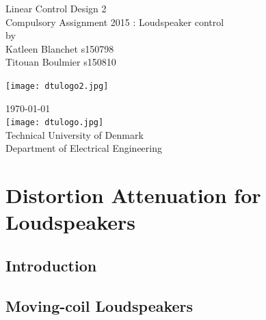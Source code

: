 \documentclass[12pt,a4paper,fleqn, onesside]{report}
\begin{document}
\begin{titlepage}
\begin{center}
\vspace{4cm}
\Huge{ Linear Control Design 2}\\
\vspace{0.8cm}
\large{\sc Compulsory Assignment 2015 : Loudspeaker control\\}
\vspace{1.2cm}
\normalsize{by}\\
\vspace{1.2cm}
{\sc
\large Katleen Blanchet s150798  \\ 
Titouan Boulmier s150810\\
}
\vspace{2cm}
\begin{center}
\texttt{[image: dtulogo2.jpg]}
\end{center} 
\vspace{3.1cm}
\normalsize{\today}\\
\vspace{1.37cm}
\texttt{[image: dtulogo.jpg]}\\
\vspace{0.2cm}
\normalsize{Technical University of Denmark \\ Department of Electrical Engineering \\
}
\end{center}
\end{titlepage}
\thispagestyle{empty}

\pagebreak
{}
\setcounter{page}{1}
\setcounter{tocdepth}{4}
\setcounter{secnumdepth}{4} 
\tableofcontents
\newpage
{}
\def\chaptername{Exercice}

\chapter{Distortion Attenuation for Loudspeakers}
\section*{Introduction}


\section{Moving-coil Loudspeakers}
\end{document}
